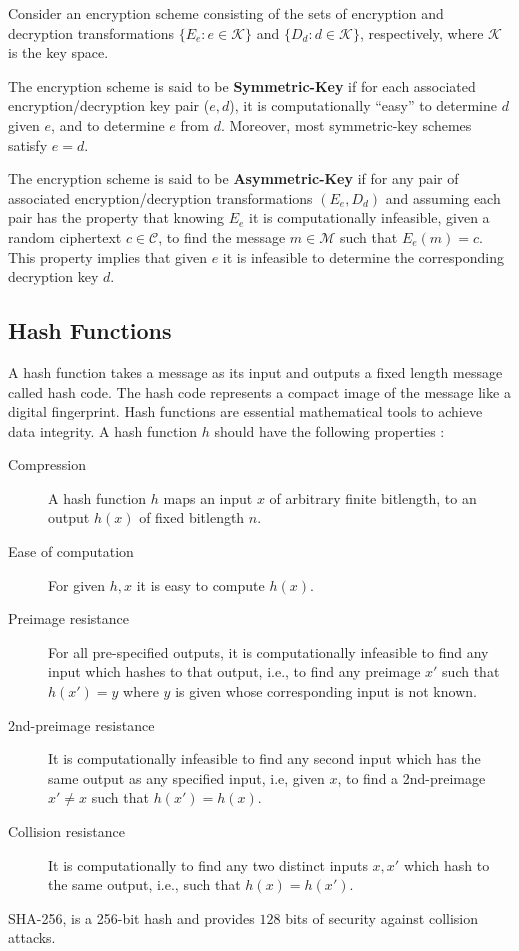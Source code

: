 \documentclass[%
  slidesonly,%
  semlayer%
  ]{xseminar}                                  %
\begin{document}
\begin{slide}
    Consider an encryption scheme consisting of the sets of encryption and decryption transformations $\{E_{e}: e \in \mathcal{K}\}$ and $\{D_{d}: d \in \mathcal{K}\}$, respectively, where $\mathcal{K}$ is the key space.

    The encryption scheme is said to be \textbf{Symmetric-Key} if for each associated encryption/decryption key pair ($e,d$), it is computationally ``easy'' to determine $d$ given $e$, and to determine $e$ from $d$.
    Moreover, most symmetric-key schemes satisfy $e = d$.
    
    The encryption scheme is said to be \textbf{Asymmetric-Key} if for any pair of associated encryption/decryption transformations $(E_{e},D_{d})$ and assuming each pair has the property that knowing $E_{e}$ it is computationally infeasible, given a random ciphertext $c \in \mathcal{C}$, to find the message $m \in \mathcal{M}$ such that $E_{e}(m) = c$.
    This property implies that given $e$ it is infeasible to determine the corresponding decryption key $d$.

    \clearpage

  \subsection*{Hash Functions}
    A hash function takes a message as its input and outputs a fixed length message called hash code.
    The hash code represents a compact image of the message like a digital fingerprint.
    Hash functions are essential mathematical tools to achieve data integrity.
    A hash function $h$ should have the following properties :
    \begin{description}
      \item [Compression] A hash function $h$ maps an input $x$ of arbitrary finite bitlength, to an output $h(x)$ of fixed bitlength $n$.
      \item [Ease of computation] For given $h,x$ it is easy to compute $h(x)$.
      \item [Preimage resistance] For all pre-specified outputs, it is computationally infeasible to find any input which hashes to that output, i.e., to find any preimage $x'$ such that $h(x') = y$ where $y$ is given whose corresponding input is not known.
      \item [2nd-preimage resistance] It is computationally infeasible to find any second input which has the same output as any specified input, i.e, given $x$, to find a 2nd-preimage $x' \neq x$ such that $h(x') = h(x)$.
      \item [Collision resistance] It is computationally to find any two distinct inputs $x,x'$ which hash to the same output, i.e., such that $h(x) = h(x')$.
    \end{description}
    SHA-256, is a 256-bit hash and provides $128$ bits of security against collision attacks.


\end{slide}
\end{document}
